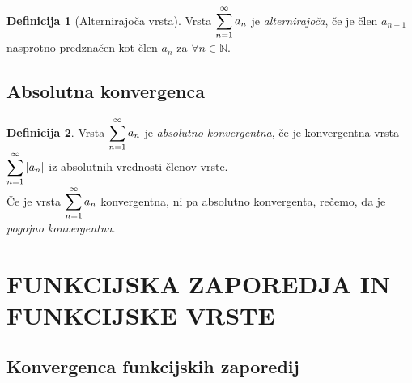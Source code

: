 \documentclass[11pt]{article}
\theoremstyle{definition}
\newtheorem{definicija}{Definicija}[section]
\theoremstyle{definition}
\theoremstyle{definition}
\theoremstyle{theorem}
\begin{document}
\begin{definicija}[Alternirajoča vrsta]

Vrsta $\mathlarger{\sum_{n=1}^{\infty} a_n}$ je \textit{alternirajoča}, če je člen $a_{n+1}$ nasprotno predznačen kot člen $a_n$ za $\forall n \in \mathbb{N}$.

\end{definicija}
\vspace{0.5cm}


\subsection{Absolutna konvergenca}

\begin{definicija}

Vrsta $\mathlarger{\sum_{n=1}^{\infty} a_n}$ je \textit{absolutno konvergentna}, če je konvergentna vrsta $\mathlarger{\sum_{n=1}^{\infty} |a_n|}$ iz absolutnih vrednosti členov vrste. \\
Če je vrsta $\mathlarger{\sum_{n=1}^{\infty} a_n}$ konvergentna, ni pa absolutno konvergenta, rečemo, da je \textit{pogojno konvergentna}.

\end{definicija}
\vspace{0.5cm}


\pagebreak


\section{FUNKCIJSKA ZAPOREDJA IN FUNKCIJSKE VRSTE}
\vspace{0.5cm}


\subsection{Konvergenca funkcijskih zaporedij}
\vspace{0.5cm}
\end{document}
